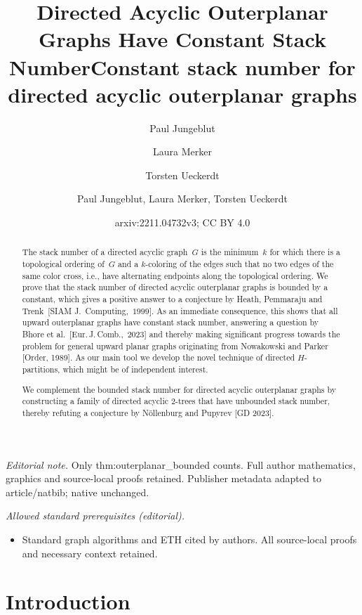 \documentclass{article}
\author{Paul Jungeblut \and Laura Merker \and Torsten Ueckerdt}\date{}
\title{Directed Acyclic Outerplanar Graphs Have Constant Stack Number}
\title{Constant stack number for directed acyclic outerplanar graphs}
\author{Paul Jungeblut, Laura Merker, Torsten Ueckerdt}
\date{arxiv:2211.04732v3; CC BY 4.0}
\begin{document}
\maketitle
\noindent\textit{Editorial note.} Only thm:outerplanar\_bounded counts. Full author mathematics, graphics and source-local proofs retained. Publisher metadata adapted to article/natbib; native unchanged.\par\medskip
\noindent\textit{Allowed standard prerequisites (editorial).}\begin{itemize}
\item Standard graph algorithms and ETH cited by authors. All source-local proofs and necessary context retained.
\end{itemize}\medskip

\maketitle

\begin{abstract}
    The stack number of a directed acyclic graph~$G$ is the minimum~$k$ for which there is a topological ordering of~$G$ and a $k$-coloring of the edges such that no two edges of the same color cross, i.e., have alternating endpoints along the topological ordering.
    We prove that the stack number of directed acyclic outerplanar graphs
    is bounded by a constant, which gives a positive answer to a conjecture by Heath, Pemmaraju and Trenk~[SIAM J.\ Computing,~$1999$].
    As an immediate consequence, this shows that all upward outerplanar graphs have constant stack number, answering a question by Bhore et al.~[Eur.\,J.\,Comb.,~2023] and thereby making significant progress towards the problem for general upward planar graphs originating from Nowakowski and Parker [Order, 1989]. 
    As our main tool we develop the novel technique of directed $H$-partitions, which might be of independent interest.

    We complement the bounded stack number for directed acyclic outerplanar graphs by constructing a family of directed acyclic $2$-trees that have unbounded stack number, 
    thereby refuting a conjecture by Nöllenburg and Pupyrev [GD 2023].
\end{abstract}


\section{Introduction}
\end{document}
